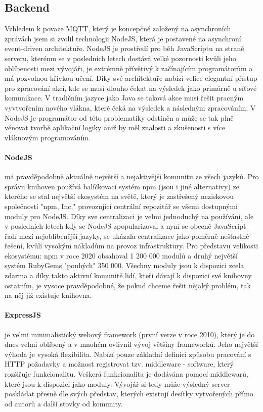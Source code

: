 \documentclass[thesis=B,czech]{FITthesis}[2019/12/23]
\begin{document}
\subsection{Backend}    %
Vzhledem k povaze MQTT, který je koncepčně založený na asynchroních zprávách jsem si zvolil technologii NodeJS, která je postavené na asynchroní event-driven architektuře. NodeJS je prostředí pro běh JavaScriptu na straně serveru, kterému se v posledních letech dostává velké pozornosti kvůli jeho oblíbenosti mezi vývojáři, je extrémně přívětivý k začínajícím programátorům a má pozvolnou křivkou učení. Díky své architektuře nabízí velice elegantní přístup pro zpracování akcí, kde se musí dlouho čekat na výsledek jako primárně u síťové komunikace. V tradičním jazyce jako Java se taková akce musí řešit pracným vyvtvořením nového vlákna, které čeká na výsledek a následným zpracováním. V NodeJS je programátor od této problematiky odstíněn a může se tak plně věnovat tvorbě aplikační logiky aniž by měl znalosti a zkušenosti s více vláknovým programováním.

\paragraph{NodeJS} má pravděpodobně aktuálně největší a nejaktivější komunitu ze všech jazyků. Pro správu knihoven používá balíčkovací systém npm (jsou i jiné alternativy) ze kterého se stal největší ekosystém na světě, který je zastřešený neziskovou společností "npm, Inc." provozující centrální repozitář se všemi dostupnými moduly pro NodeJS. Díky sve centralizaci je velmi jednoduchý na používání, ale v posledních letech kdy se NodeJS zpopularizoval a nyní se obecně JavaScript řadí mezí nejoblíbenější jazyky, se ukázala centralizace jako poměrně nešťastné řešení, kvůli vysokým nákladům na provoz infrastruktury. Pro představu velikosti ekosystému: npm v roce 2020 obsahoval 1 200 000 modulů a druhý největší systém RubyGems "pouhých" 350 000. Všechny moduly jsou k dispozici zcela zdarma a díky takto aktivní komunitě lidí, kteří dávají k dispozici své knihovny ostatním, je vysoce pravděpodobné, že pokud chceme řešit nějaký problém, tak na něj již existuje knihovna.

\paragraph{ExpressJS} je velmi minimalistický webový framework (první verze v roce 2010), který je do dnes velmi oblíbený a v mnohém ovlivnil vývoj většiny frameworků. Jeho největší výhoda je vysoká flexibilita. Nabízí pouze základní definici způsobu pracování s HTTP požadavky a možnost registrovat tzv. middleware - software, který rozšiřuje funkcionalitu. Veškerá funkcionalita je dodávána pomocí middlewarů, které jsou k dispozici jako moduly. Vývojář si tedy může výsledný server poskládat přesně dle svých představ, kterých existují desítky vytvořených přímo od autorů a další stovky od komunity.
\end{document}
